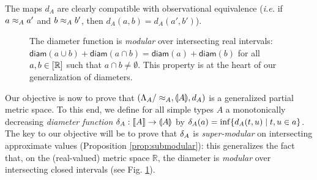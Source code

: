 The maps $d_{A}$ are clearly compatible with observational equivalence (\textit{i.e.} if $a \approx_A a'$ and $b \approx_A b'$, then $d_A(a,b) = d_A(a',b')$). 


\begin{figure}
\caption{\small The diameter function is \emph{modular} over intersecting real intervals: 
$\mathsf{diam}(a\cup  b)+\mathsf{diam}(a\cap b)=\mathsf{diam}(a)+\mathsf{diam}(b)$ for all $a,b\in [\mathbb{R}]$ such that $a\cap b\neq \emptyset$.
This property is at the heart of our generalization of diameters.}
\label{fig:modular}
\end{figure}


Our objective is now to prove that $\left(\Lambda_A/\approx_A, \llparenthesis A \rrparenthesis, d_A\right)$ is a generalized partial metric space.
To this end, we define for all simple types $A$ a monotonically decreasing \emph{diameter function} $\delta_A : \llbracket A \rrbracket \to \llparenthesis A \rrparenthesis$ by $\delta_A(a) = \inf \{ d_A(t,u) \mid t,u \in a \}$. The key to our objective will be to prove that $\delta_{A}$ is \emph{super-modular} on intersecting approximate values (Proposition \ref{prop:submodular}): this generalizes the fact that, on the (real-valued) metric space $\mathbb{R}$, the diameter is \emph{modular} over intersecting closed intervals (see Fig. \ref{fig:modular}).
 
